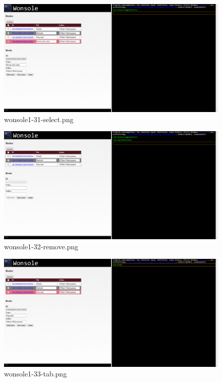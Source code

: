 \clearpage
\begin{figure}
\includegraphics[width=\textwidth]{screenshot/wonsole1-31-select.png}
\caption{wonsole1-31-select.png}
\label{wonsole1-31-select.png}
\end{figure}


\begin{figure}
\includegraphics[width=\textwidth]{screenshot/wonsole1-32-remove.png}
\caption{wonsole1-32-remove.png}
\label{wonsole1-32-remove.png}
\end{figure}


\clearpage
\begin{figure}
\includegraphics[width=\textwidth]{screenshot/wonsole1-33-tab.png}
\caption{wonsole1-33-tab.png}
\label{wonsole1-33-tab.png}
\end{figure}


